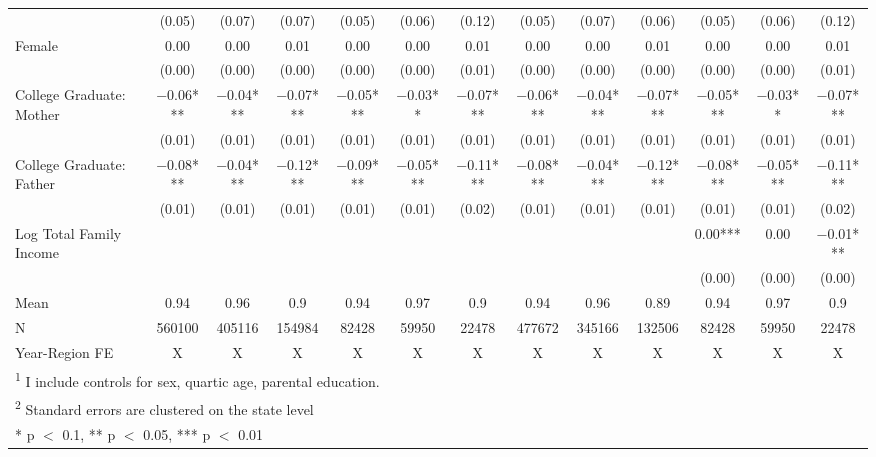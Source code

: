 \begin{landscape}
\begin{table}[!h]
{\begin{tabular}[t]{lcccccccccccc}
 & (\num{0.05}) & (\num{0.07}) & (\num{0.07}) & (\num{0.05}) & (\num{0.06}) & (\num{0.12}) & (\num{0.05}) & (\num{0.07}) & (\num{0.06}) & (\num{0.05}) & (\num{0.06}) & (\num{0.12})\\
Female & \num{0.00} & \num{0.00} & \num{0.01} & \num{0.00} & \num{0.00} & \num{0.01} & \num{0.00} & \num{0.00} & \num{0.01} & \num{0.00} & \num{0.00} & \num{0.01}\\
 & (\num{0.00}) & (\num{0.00}) & (\num{0.00}) & (\num{0.00}) & (\num{0.00}) & (\num{0.01}) & (\num{0.00}) & (\num{0.00}) & (\num{0.00}) & (\num{0.00}) & (\num{0.00}) & (\num{0.01})\\
College Graduate: Mother & \num{-0.06}*** & \num{-0.04}*** & \num{-0.07}*** & \num{-0.05}*** & \num{-0.03}** & \num{-0.07}*** & \num{-0.06}*** & \num{-0.04}*** & \num{-0.07}*** & \num{-0.05}*** & \num{-0.03}** & \num{-0.07}***\\
 & (\num{0.01}) & (\num{0.01}) & (\num{0.01}) & (\num{0.01}) & (\num{0.01}) & (\num{0.01}) & (\num{0.01}) & (\num{0.01}) & (\num{0.01}) & (\num{0.01}) & (\num{0.01}) & (\num{0.01})\\
College Graduate: Father & \num{-0.08}*** & \num{-0.04}*** & \num{-0.12}*** & \num{-0.09}*** & \num{-0.05}*** & \num{-0.11}*** & \num{-0.08}*** & \num{-0.04}*** & \num{-0.12}*** & \num{-0.08}*** & \num{-0.05}*** & \num{-0.11}***\\
 & (\num{0.01}) & (\num{0.01}) & (\num{0.01}) & (\num{0.01}) & (\num{0.01}) & (\num{0.02}) & (\num{0.01}) & (\num{0.01}) & (\num{0.01}) & (\num{0.01}) & (\num{0.01}) & (\num{0.02})\\
Log Total Family Income &  &  &  &  &  &  &  &  &  & \num{0.00}*** & \num{0.00} & \num{-0.01}***\\
 &  &  &  &  &  &  &  &  &  & (\num{0.00}) & (\num{0.00}) & (\num{0.00})\\
\midrule
Mean & \num{0.94} & \num{0.96} & \num{0.9} & \num{0.94} & \num{0.97} & \num{0.9} & \num{0.94} & \num{0.96} & \num{0.89} & \num{0.94} & \num{0.97} & \num{0.9}\\
N & \num{560100} & \num{405116} & \num{154984} & \num{82428} & \num{59950} & \num{22478} & \num{477672} & \num{345166} & \num{132506} & \num{82428} & \num{59950} & \num{22478}\\
Year-Region FE & X & X & X & X & X & X & X & X & X & X & X & X\\
\bottomrule
\multicolumn{13}{l}{\rule{0pt}{1em}\textsuperscript{1} I include controls for sex, quartic age, parental education.}\\
\multicolumn{13}{l}{\rule{0pt}{1em}\textsuperscript{2} Standard errors are clustered on the state level}\\
\multicolumn{13}{l}{\rule{0pt}{1em}* p $<$ 0.1, ** p $<$ 0.05, *** p $<$ 0.01}\\
\end{tabular}}
\end{table}
\end{landscape}

